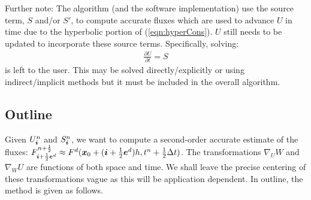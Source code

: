 Further note: The algorithm (and the software implementation) use the
source term, $S$ and/or $S'$, to compute accurate fluxes which are used to
advance $U$ in time due to the hyperbolic portion of (\ref{eqn:hyperCons}).
$U$ still needs to be updated to incorporate these source terms.
Specifically, solving:
\begin{gather*}
\frac{\partial U}{\partial t} = S
\end{gather*}
is left to the user.  This may be solved directly/explicitly or using
indirect/implicit methods but it must be included in the overall algorithm.

\subsection{Outline}

Given $U^n_{\boldsymbol{i}}$ and $S^n_{\boldsymbol{i}}$, we want to compute a second-order accurate
estimate of the fluxes: $F^{n+\frac{1}{2}}_{{\boldsymbol{i}}+\frac{1}{2} {\boldsymbol{e}}^d} \approx
F^d({\boldsymbol{x}}_0 +({\boldsymbol{i}}+\frac{1}{2} {\boldsymbol{e}}^d)h,t^n + \frac{1}{2} \Delta t)$.
The transformations $\nabla_U W $ and $\nabla_W U$ are functions of both
space and time.  We shall leave the precise centering of these transformations
vague as this will be application dependent.
In outline, the method is given as follows.

